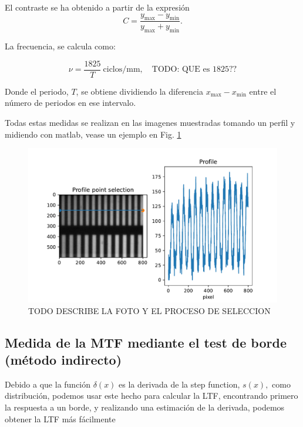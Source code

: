 \documentclass{./packages/optica-article}
\begin{document}
El contraste se ha obtenido a partir de la expresión
\nopagebreak
\begin{equation}
	C = \frac{y_{\max} - y_{\min}}{y_{\max} + y_{\min}}.
	\label{eq:contraste}
\end{equation}

La frecuencia, se calcula como:

\begin{equation}
	\nu = \frac{1825}{T}\ \textrm{ciclos/mm},\quad\textrm{TODO: QUE es 1825??}
	\label{eq:frecuencia}
\end{equation}

Donde el periodo, $T$, se obtiene dividiendo la diferencia $x_{\max} - x_{\min}$ entre el número de periodos en ese intervalo.

Todas estas medidas se realizan en las imagenes muestradas tomando un perfil y midiendo con matlab, vease un ejemplo en Fig. \ref{fig:example}

\begin{figure}[p]
\includegraphics[width=\textwidth]{profile-lines.pdf}
\caption{TODO DESCRIBE LA FOTO Y EL PROCESO DE SELECCION}
\label{fig:example}
\end{figure}

\subsection{Medida de la MTF mediante el test de borde (método indirecto)}

Debido a que la función $\delta(x)$ es la derivada de la step function, $s(x),$ como distribución, podemos usar este hecho para calcular la LTF, encontrando primero la respuesta a un borde, y realizando una estimación de la derivada, podemos obtener la LTF más fácilmente
\end{document}

